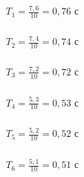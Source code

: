 \begin{enumerate}
		\label{appendix: 11}
		\begin{multicols}{3}
			\(\begin{aligned}T_1 = \frac{7,6}{10} = 0,76 \text{ с}\end{aligned}\) \\\\
			\(\begin{aligned}T_2 = \frac{7,4}{10} = 0,74 \text{ с}\end{aligned}\) \\\\
			\(\begin{aligned}T_3 = \frac{7,2}{10} = 0,72 \text{ с}\end{aligned}\) \\\\
			\(\begin{aligned}T_4 = \frac{5,3}{10} = 0,53 \text{ с}\end{aligned}\) \\\\
			\(\begin{aligned}T_5 = \frac{5,2}{10} = 0,52 \text{ с}\end{aligned}\) \\\\
			\(\begin{aligned}T_6 = \frac{5,1}{10} = 0,51 \text{ с}\end{aligned}\) \\\\
		\end{multicols}
		

\end{enumerate}
